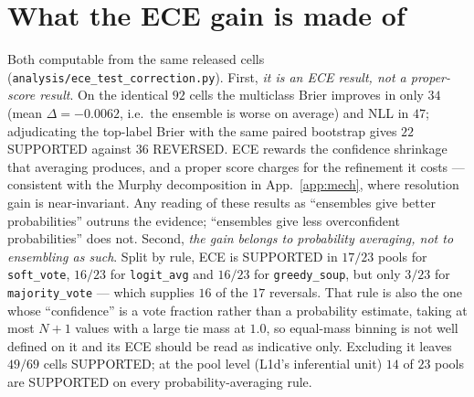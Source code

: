 \documentclass[11pt]{article}
\begin{document}
\section{What the ECE gain is made of}\label{app:ecequal}
Both computable from the same released cells (\texttt{analysis/\allowbreak ece\_\allowbreak test\_\allowbreak correction.\allowbreak py}). First, \emph{it is an ECE result, not a proper-score result}. On the identical $92$ cells the multiclass Brier improves in only $34$ (mean $\Delta{=}{-}0.0062$, i.e.\ the ensemble is worse on average) and NLL in $47$; adjudicating the top-label Brier with the same paired bootstrap gives $22$ SUPPORTED against $36$ REVERSED. ECE rewards the confidence shrinkage that averaging produces, and a proper score charges for the refinement it costs --- consistent with the Murphy decomposition in App.~\ref{app:mech}, where resolution gain is near-invariant. Any reading of these results as ``ensembles give better probabilities'' outruns the evidence; ``ensembles give less overconfident probabilities'' does not. Second, \emph{the gain belongs to probability averaging, not to ensembling as such}. Split by rule, ECE is SUPPORTED in $17/23$ pools for \texttt{soft\_vote}, $16/23$ for \texttt{logit\_avg} and $16/23$ for \texttt{greedy\_soup}, but only $3/23$ for \texttt{majority\_vote} --- which supplies $16$ of the $17$ reversals. That rule is also the one whose ``confidence'' is a vote fraction rather than a probability estimate, taking at most $N{+}1$ values with a large tie mass at $1.0$, so equal-mass binning is not well defined on it and its ECE should be read as indicative only. Excluding it leaves $49/69$ cells SUPPORTED; at the pool level (L1d's inferential unit) $14$ of $23$ pools are SUPPORTED on every probability-averaging rule.
\end{document}
